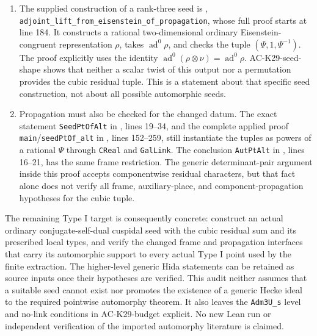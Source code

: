 \begin{remark}
\begin{enumerate}
\item The supplied construction of a rank-three seed is
,
\texttt{adjoint\_lift\_from\_eisenstein\_of\_propagation},
whose full proof starts at line 184.  It constructs a
rational two-dimensional ordinary Eisenstein-congruent
representation $\rho$, takes $\operatorname{ad}^0\rho$,
and checks the tuple $(\Psi,1,\Psi^{-1})$.
The proof explicitly uses the identity
$\operatorname{ad}^0(\rho\otimes\nu)
=\operatorname{ad}^0\rho$.
AC-K29-seed-shape shows that neither a scalar twist of
this output nor a permutation provides the cubic residual
tuple.  This is a statement about that specific seed
construction, not about all possible automorphic seeds.

\item Propagation must also be checked for the changed datum.
The exact statement \texttt{SeedPtOfAlt} in
, lines 19--34, and the complete applied
proof \texttt{main}/\texttt{seedPtOf\_alt} in
, lines 152--259, still instantiate
the tuples as powers of a rational $\Psi$ through
\texttt{CReal} and \texttt{GalLink}.
The conclusion \texttt{AutPtAlt} in
, lines 16--21, has the same frame
restriction.  The generic determinant-pair argument
inside this proof accepts componentwise residual
characters, but that fact alone does not verify all
frame, auxiliary-place, and component-propagation
hypotheses for the cubic tuple.
\end{enumerate}

The remaining Type I target is consequently concrete:
construct an actual ordinary conjugate-self-dual cuspidal
seed with the cubic residual sum and its prescribed local
types, and verify the changed frame and propagation
interfaces that carry its automorphic support to every
actual Type I point used by the finite extraction.
The higher-level generic Hida statements can be retained
as source inputs once their hypotheses are verified.
This audit neither assumes that a suitable seed cannot
exist nor promotes the existence of a generic Hecke ideal
to the required pointwise automorphy theorem.
It also leaves the \texttt{Adm3U\_s} level and no-link
conditions in AC-K29-budget explicit.  No new Lean run or
independent verification of the imported automorphy
literature is claimed.
\end{remark}


